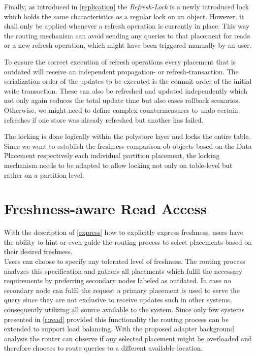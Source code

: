 Finally, as introduced in \ref{replication} the \emph{Refresh-Lock} is a newly introduced lock which holds the same characteristics as a regular lock on an object.
However, it shall only be applied whenever a refresh operation is currently in place. This way the routing mechanism can avoid sending any queries to that placement
for reads or a new refresh operation, which might have been triggered manually by an user.

To ensure the correct execution of refresh operations every placement that is outdated will receive an independent propagation- or refresh-transaction.
The serialization order of the updates to be executed is the commit order of the initial write transaction.
These can also be refreshed and updated independently which not only again reduces the total update time but also eases rollback scenarios.
Otherwise, we might need to define complex countermeasures to undo certain refreshes if one store was already refreshed but another has failed.


The locking is done logically within the polystore layer and locks the entire table.
Since we want to establish the freshness comparison ob objects based on the Data Placement respectively each individual partition placement, the locking mechanism
needs to be adapted to allow locking not only on table-level but rather on a partition level. 


\section{Freshness-aware Read Access}
\label{sec:read_access}



With the description of \ref{express} how to explicitly express freshness, users have the ability to hint or even guide the routing process to select placements 
based on their desired freshness.\\
Users can choose to specify any tolerated level of freshness. The routing process analyzes this specification and gathers all placements which fulfil the necessary 
requirements by preferring secondary nodes labeled as outdated.
In case no secondary node can fulfil the request a primary placement is used to serve the query since they are not exclusive to receive updates such in other systems,
consequently utilizing all source available to the system.
Since only few systems presented in \ref{r:read} provided this functionality the routing process can be extended to support load balancing. 
With the proposed adapter background analysis the router can observe if any selected placement might be overloaded and therefore chooses to route 
queries to a different available location. \\



